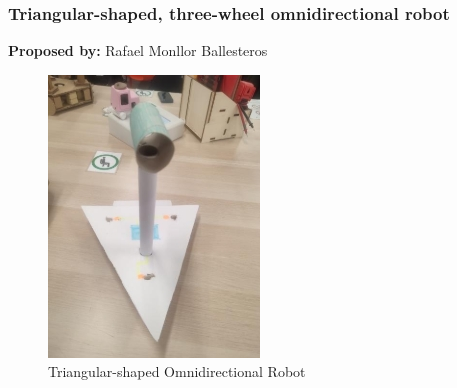 \subsubsection{Triangular-shaped, three-wheel omnidirectional robot}

\textbf{Proposed by:} Rafael Monllor Ballesteros

\begin{figure}[H]
    \centering
    \includegraphics[width=0.5\linewidth]{../ReportMovementModule/images/Aspose.Words.728084da-df58-4b9d-a372-f65cffbdb23d.003.jpeg}
    \caption{Triangular-shaped Omnidirectional Robot}
\end{figure}

